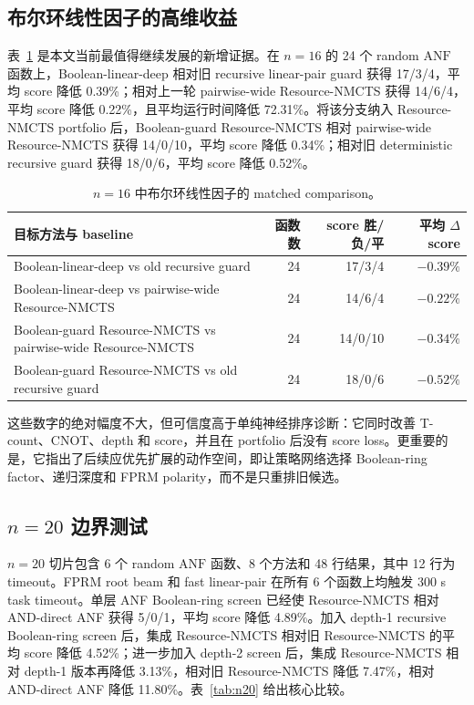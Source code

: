 \documentclass[UTF8,fontset=macnew,11pt]{ctexart}
\newcommand{\method}{Resource-NMCTS}
\newcommand{\anf}{\ensuremath{\mathrm{ANF}}}
\begin{document}
\subsection{布尔环线性因子的高维收益}

表~\ref{tab:boolean_ring} 是本文当前最值得继续发展的新增证据。在 $n=16$ 的 24 个 random \anf{} 函数上，Boolean-linear-deep 相对旧 recursive linear-pair guard 获得 17/3/4，平均 score 降低 0.39\%；相对上一轮 pairwise-wide \method{} 获得 14/6/4，平均 score 降低 0.22\%，且平均运行时间降低 72.31\%。将该分支纳入 \method{} portfolio 后，Boolean-guard \method{} 相对 pairwise-wide \method{} 获得 14/0/10，平均 score 降低 0.34\%；相对旧 deterministic recursive guard 获得 18/0/6，平均 score 降低 0.52\%。

\begin{table}[t]
\centering
\small
\caption{$n=16$ 中布尔环线性因子的 matched comparison。}
\label{tab:boolean_ring}
\begin{tabularx}{\linewidth}{>{\raggedright\arraybackslash}Xrrr}
\toprule
目标方法与 baseline & 函数数 & score 胜/负/平 & 平均 $\Delta$ score \\
\midrule
Boolean-linear-deep vs old recursive guard & 24 & 17/3/4 & $-0.39\%$ \\
Boolean-linear-deep vs pairwise-wide \method{} & 24 & 14/6/4 & $-0.22\%$ \\
Boolean-guard \method{} vs pairwise-wide \method{} & 24 & 14/0/10 & $-0.34\%$ \\
Boolean-guard \method{} vs old recursive guard & 24 & 18/0/6 & $-0.52\%$ \\
\bottomrule
\end{tabularx}
\end{table}

这些数字的绝对幅度不大，但可信度高于单纯神经排序诊断：它同时改善 T-count、CNOT、depth 和 score，并且在 portfolio 后没有 score loss。更重要的是，它指出了后续应优先扩展的动作空间，即让策略网络选择 Boolean-ring factor、递归深度和 FPRM polarity，而不是只重排旧候选。

\subsection{\texorpdfstring{$n=20$}{n=20} 边界测试}

$n=20$ 切片包含 6 个 random \anf{} 函数、8 个方法和 48 行结果，其中 12 行为 timeout。FPRM root beam 和 fast linear-pair 在所有 6 个函数上均触发 300 s task timeout。单层 ANF Boolean-ring screen 已经使 \method{} 相对 AND-direct ANF 获得 5/0/1，平均 score 降低 4.89\%。加入 depth-1 recursive Boolean-ring screen 后，集成 \method{} 相对旧 \method{} 的平均 score 降低 4.52\%；进一步加入 depth-2 screen 后，集成 \method{} 相对 depth-1 版本再降低 3.13\%，相对旧 \method{} 降低 7.47\%，相对 AND-direct ANF 降低 11.80\%。表~\ref{tab:n20} 给出核心比较。
\end{document}
